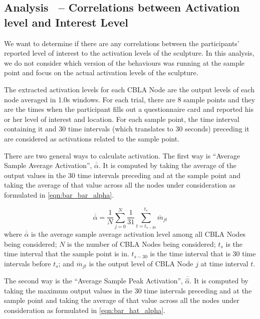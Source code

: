 \subsection{Analysis~ -- Correlations between Activation level and Interest Level}

We want to determine if there are any correlations between the participants' reported level of interest to the activation levels of the sculpture. In this analysis, we do not consider which version of the behaviours was running at the sample point and focus on the actual activation levels of the sculpture.

The extracted activation levels for each CBLA Node are the output levels of each node averaged in 1.0s windows. For each trial, there are 8 sample points and they are the times when the participant fills out a questionnaire card and reported his or her level of interest and location. For each sample point, the time interval containing it and 30 time intervals (which translates to 30 seconds) preceding it are considered as activations related to the sample point.

There are two general ways to calculate activation. The first way is ``Average Sample Average Activation'',  $\overline{\overline{\alpha}}$. It is computed by taking the average of the output values in the 30 time intervals preceding and at the sample point and taking the average of that value across all the nodes under consideration as formulated in \eqref{eqn:bar_bar_alpha}.

\begin{equation}\label{eqn:bar_bar_alpha}
	\overline{\overline{\alpha}} = \frac{1}{N}\sum_{j=0}^{N}\frac{1}{31}\sum_{t=t_{s-30}}^{t_{s}}\overline{m}_{jt}
\end{equation}
where $\overline{\overline{\alpha}}$ is the average sample average activation level among all CBLA Nodes being considered; $N$ is the number of CBLA Nodes being considered; $t_s$ is the time interval that the sample point is in. $t_{s-30}$ is the time interval that is 30 time intervals before $t_s$; and $\overline{m}_{jt}$ is the output level of CBLA Node $j$ at time interval $t$. 

The second way is the ``Average Sample Peak Activation'', $\overline{\widehat{\alpha}}$. It is computed by taking the maximum output values in the 30 time intervals preceding and at the sample point and taking the average of that value across all the nodes under consideration as formulated in \eqref{eqn:bar_hat_alpha}.

